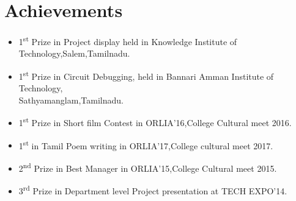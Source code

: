 \documentclass[a4paper,12pt,line]{article}
\begin{document}
	\section*{{\color{magenta}Achievements}}
	\begin{itemize}
		\item 1\textsuperscript{st} Prize in Project display held in Knowledge Institute of Technology,Salem,Tamilnadu.
		\item 1\textsuperscript{st} Prize in Circuit Debugging, held in Bannari Amman Institute of Technology,\\Sathyamanglam,Tamilnadu.
		\item 1\textsuperscript{st} Prize in Short film Contest in ORLIA’16,College Cultural meet 2016.
		\item 1\textsuperscript{st} in Tamil Poem writing in ORLIA'17,College cultural meet 2017.
		\item 2\textsuperscript{nd} Prize in Best Manager in ORLIA’15,College Cultural meet 2015.
		\item 3\textsuperscript{rd} Prize in Department level Project presentation at TECH EXPO’14.
	\end{itemize}
\end{document}
